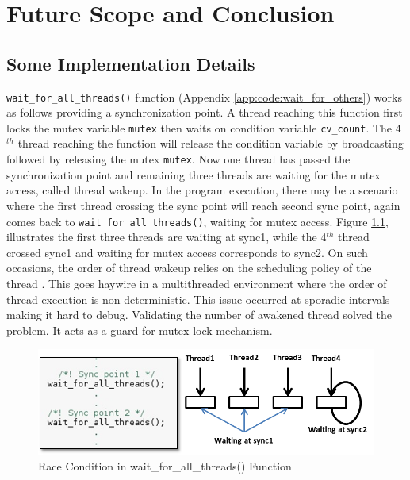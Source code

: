 \chapter{Future Scope and Conclusion}
\label{chap:conclusion}


\section{Some Implementation Details}
\label{sec:ch5:hurdles}

\verb|wait_for_all_threads()| function (Appendix \ref{app:code:wait_for_others}) works as follows providing a synchronization point. A thread reaching this function first locks the mutex variable \verb|mutex| then waits on condition variable \verb|cv_count|. The 4$^{th}$ thread reaching the function will release the condition variable by broadcasting followed by releasing the mutex \verb|mutex|. Now one thread has passed the synchronization point and remaining three threads are waiting for the mutex access, called thread wakeup. In the program execution, there may be a scenario where the first thread crossing the sync point will reach second sync point, again comes back to  \verb|wait_for_all_threads()|, waiting for mutex access. Figure \ref{fig:conclusion:thread_wakeup}, illustrates the first three threads are waiting at sync1, while the 4$^{th}$ thread crossed sync1 and waiting for mutex access corresponds to sync2. On such occasions, the order of thread wakeup relies on the scheduling policy of the thread \cite{pthreadWait}. This goes haywire in a multithreaded environment where the order of thread execution is non deterministic. This issue occurred at sporadic intervals making it hard to debug. Validating the number of awakened thread solved the problem. It acts as a guard for mutex lock mechanism. \\

\begin{figure}[h!]
	\centering
	\includegraphics[width=140mm]{figures/wait_for_all_threads}
	\caption{Race Condition in wait\_for\_all\_threads() Function}
	\label{fig:conclusion:thread_wakeup}
\end{figure}

